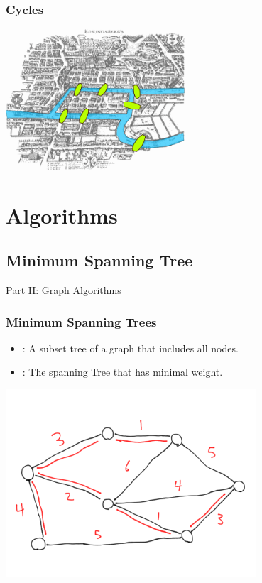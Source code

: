 \documentclass{beamer}
\begin{document}
\begin{frame}
  \frametitle{Cycles}
  \begin{center}
    \includegraphics[width=0.5\textwidth]{img/eulerian}
  \end{center}
\end{frame}

\section{Algorithms}
\subsection{Minimum Spanning Tree}

\begin{frame}
  \begin{center}
    Part II: Graph Algorithms
  \end{center}
\end{frame}

\begin{frame}
  \frametitle{Minimum Spanning Trees}
  \begin{block}{}
    \begin{itemize}
    \item {}: A subset tree of a graph that includes all nodes.
    \item {}: The spanning Tree that has minimal weight.
    \end{itemize}
  \end{block}
  \begin{center}
    \includegraphics[width=0.7\textwidth]{img/minspantree}
  \end{center}
\end{frame}
\end{document}

